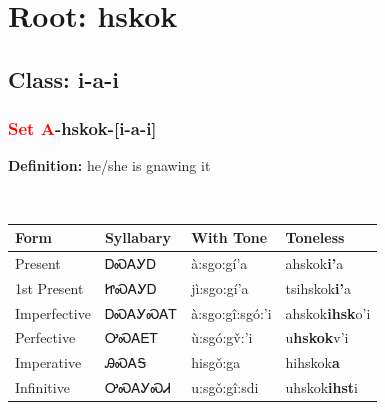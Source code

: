 \needspace{4in}
\section*{Root: hskok}
\nopagebreak
{}
\needspace{3in}
\subsection*{Class: i-a-i}
\nopagebreak
\needspace{2in}
\subsubsection*{\textcolor{Red}{Set A}{-}\textbf{hskok}{-}[i-a-i]}
\nopagebreak
\textbf{Definition: } he/she is gnawing it
\\[0.5em]
\begin{tabularx}{\textwidth}{l X X X}%
\toprule%
\textbf{Form}&\textbf{Syllabary}&\textbf{With Tone}&\textbf{Toneless}\\%
\midrule%
Present&ᎠᏍᎪᎩᎠ&à:sgo:gí’a&ahskok\textbf{i'}a\\%
1st Present&ᏥᏍᎪᎩᎠ&jì:sgo:gí’a&tsihskok\textbf{i'}a\\%
Imperfective&ᎠᏍᎪᎩᏍᎪᎢ&à:sgo:gî:sgó:’i&ahskok\textbf{ihsk}o'i\\%
Perfective&ᎤᏍᎪᎬᎢ&ù:sgó:gv̌:’i&u\textbf{hskok}v'i\\%
Imperative&ᎯᏍᎪᎦ&hisgǒ:ga&hihskok\textbf{a}\\%
Infinitive&ᎤᏍᎪᎩᏍᏗ&u:sgǒ:gî:sdi&uhskok\textbf{ihst}i\\%
\bottomrule%
\end{tabularx}
\\[1em]